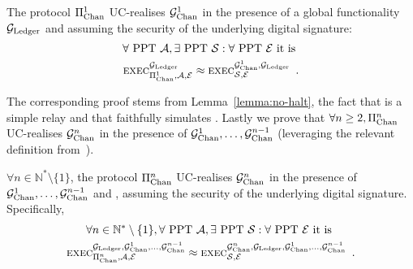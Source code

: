 \begin{theorem}
  \label{theorem:security:simple}
  The protocol $\Pi_{\mathrm{Chan}}^{1}$ UC-realises $\mathcal{G}_{\mathrm{Chan}}^{1}$ in the presence of a
  global functionality $\mathcal{G}_{\mathrm{Ledger}}$ and assuming the security of the underlying
  digital signature:
  \begin{gather*}
    \forall \text{ PPT } \mathcal{A}, \exists \text{ PPT } \mathcal{S}: \forall
    \text{ PPT } \mathcal{E} \text{ it is }\\
    \textsc{exec}^{\mathcal{G}_{\mathrm{Ledger}}}_{\Pi_{\mathrm{Chan}}^{1}, \mathcal{A}, \mathcal{E}} \approx
    \textsc{exec}^{\mathcal{G}_{\mathrm{Chan}}^{1}, \mathcal{G}_{\mathrm{Ledger}}}_{\mathcal{S}, \mathcal{E}} \enspace.
  \end{gather*}
\end{theorem}

  The corresponding proof stems from
  Lemma~\ref{lemma:no-halt}, the fact that \fchan is a simple relay and that
  \simulator faithfully simulates \pchan. Lastly we prove that $\forall n \geq 2, \Pi_{\mathrm{Chan}}^{n}$ UC-realises $\mathcal{G}_{\mathrm{Chan}}^{n}$
  in the presence of $\mathcal{G}_{\mathrm{Chan}}^{1}, \dots, \mathcal{G}_{\mathrm{Chan}}^{n-1}$
  (leveraging the relevant definition
  from~\cite{DBLP:conf/tcc/BadertscherCHTZ20}).

\begin{theorem}
  \label{theorem:security:virtual}
  $\forall n \in \mathbb{N}^* \setminus \{1\}$, the protocol $\Pi_{\mathrm{Chan}}^{n}$
  UC-realises $\mathcal{G}_{\mathrm{Chan}}^{n}$ in the presence of $\mathcal{G}_{\mathrm{Chan}}^{1}, \dots,
  \mathcal{G}_{\mathrm{Chan}}^{n-1}$ and \ledger, assuming the security of the underlying digital
  signature. Specifically,
  \begin{gather*}
    \forall n \in \mathbb{N}^* \setminus \{1\}, \forall \text{ PPT } \mathcal{A},
    \exists \text{ PPT } \mathcal{S}: \forall \text{ PPT } \mathcal{E} \text{ it
    is } \\
    \textsc{exec}^{\mathcal{G}_{\mathrm{Ledger}}, \mathcal{G}_{\mathrm{Chan}}^{1}, \dots, \mathcal{G}_{\mathrm{Chan}}^{n-1}}_{\Pi_{\mathrm{Chan}}^{n},
    \mathcal{A}, \mathcal{E}} \approx
    \textsc{exec}^{\mathcal{G}_{\mathrm{Chan}}^{n}, \mathcal{G}_{\mathrm{Ledger}}, \mathcal{G}_{\mathrm{Chan}}^{1}, \dots,
    \mathcal{G}_{\mathrm{Chan}}^{n-1}}_{\mathcal{S}, \mathcal{E}} \enspace.
  \end{gather*}
\end{theorem}

